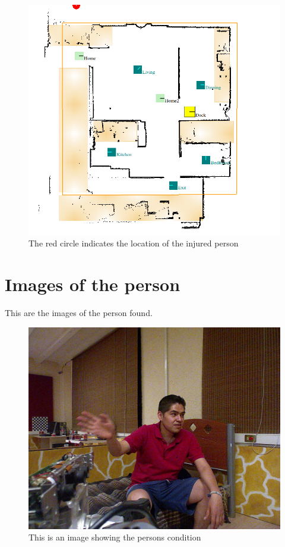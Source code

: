 \documentclass[11pt]{article}
\begin{document}
\begin{figure}[h]
	\begin{center}
		\includegraphics[width=1\textwidth]{../data/EmergencyReport/locationPeersonHurt.png}
		\caption{The red circle indicates the location of the injured person}
	\end{center}
\end{figure}

\section{Images of the person}

This are the images of the person found.

\begin{figure}[h]
	\begin{center}
		\includegraphics[width=1\textwidth]{../data/EmergencyReport/imgPeersonHurt.png}
		\caption{This is an image showing the persons condition}
	\end{center}
\end{figure}
\end{document}
